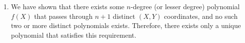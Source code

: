 \begin{myproof}
\begin{enumerate}
\item We have shown that there exists some $n$-degree (or lesser degree) polynomial $f(X)$ that passes through $n+1$ distinct $(X, Y)$ coordinates, and no such two or more distinct polynomials exists. Therefore, there exists only a unique polynomial that satisfies this requirement. 




 
\end{enumerate}
\end{myproof}

